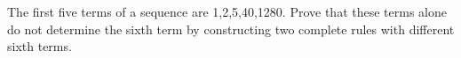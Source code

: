The first five terms of a sequence are 1,2,5,40,1280. Prove that these terms alone do not determine the sixth term by constructing two complete rules with different sixth terms.
